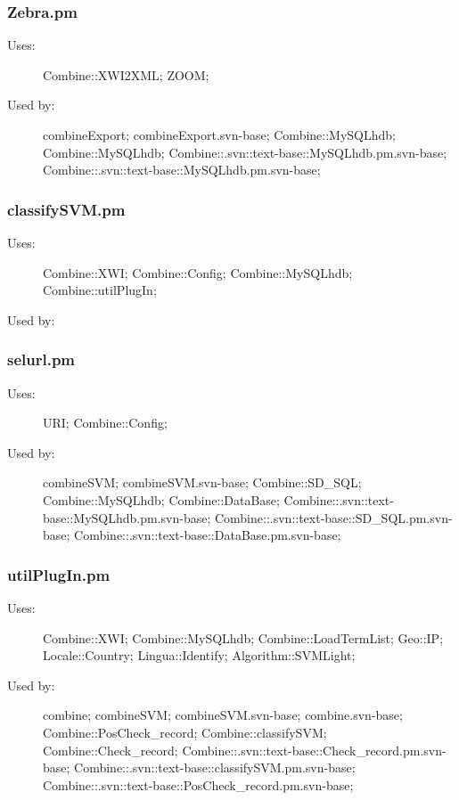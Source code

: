 \subsubsection{Zebra.pm}
\begin{description}
\item[Uses:] Combine::XWI2XML; ZOOM; 

\item[Used by:] combineExport; combineExport.svn-base; Combine::MySQLhdb; Combine::MySQLhdb; Combine::.svn::text-base::MySQLhdb.pm.svn-base; Combine::.svn::text-base::MySQLhdb.pm.svn-base; 

\end{description}
\subsubsection{classifySVM.pm}
\begin{description}
\item[Uses:] Combine::XWI; Combine::Config; Combine::MySQLhdb; Combine::utilPlugIn; 

\item[Used by:] 

\end{description}
\subsubsection{selurl.pm}
\begin{description}
\item[Uses:] URI; Combine::Config; 

\item[Used by:] combineSVM; combineSVM.svn-base; Combine::SD\_SQL; Combine::MySQLhdb; Combine::DataBase; Combine::.svn::text-base::MySQLhdb.pm.svn-base; Combine::.svn::text-base::SD\_SQL.pm.svn-base; Combine::.svn::text-base::DataBase.pm.svn-base; 

\end{description}
\subsubsection{utilPlugIn.pm}
\begin{description}
\item[Uses:] Combine::XWI; Combine::MySQLhdb; Combine::LoadTermList; Geo::IP; Locale::Country; Lingua::Identify; Algorithm::SVMLight; 

\item[Used by:] combine; combineSVM; combineSVM.svn-base; combine.svn-base; Combine::PosCheck\_record; Combine::classifySVM; Combine::Check\_record; Combine::.svn::text-base::Check\_record.pm.svn-base; Combine::.svn::text-base::classifySVM.pm.svn-base; Combine::.svn::text-base::PosCheck\_record.pm.svn-base; 

\end{description}
